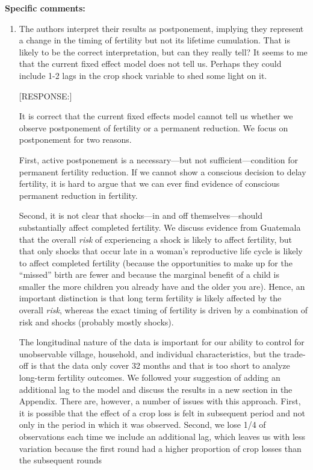\documentclass[letterpaper,12pt]{article}
\begin{document}
\noindent \textbf{Specific comments:}

\begin{enumerate}

\item The authors interpret their results as postponement, implying they
represent a change in the timing of fertility but not its lifetime
cumulation. That is likely to be the correct interpretation, but can
they really tell? It seems to me that the current fixed effect model
does not tell us. Perhaps they could include 1-2 lags in the crop shock
variable to shed some light on it.

[RESPONSE:]

It is correct that the current fixed effects model cannot tell
us whether we observe postponement of fertility or a permanent
reduction.
We focus on postponement for two reasons.

First, active postponement is a necessary---but not sufficient---condition
for permanent fertility reduction.
If we cannot show a conscious decision to delay fertility, it is 
hard to argue that we can ever find evidence of conscious permanent 
reduction in fertility.

Second, it is not clear that shocks---in and off themselves---should
substantially affect completed fertility. 
We discuss evidence from Guatemala that the overall \emph{risk} of 
experiencing a shock is likely to affect fertility, but that only
shocks that occur late in a woman's reproductive life cycle is
likely to affect completed fertility (because the opportunities to
make up for the ``missed'' birth are fewer and because the marginal
benefit of a child is smaller the more children you already have and
the older you are).
Hence, an important distinction is that long term fertility is likely
affected by the overall \emph{risk}, whereas the exact timing of
fertility is driven by a combination of risk and shocks (probably
mostly shocks).

The longitudinal nature of the data is important for our ability
to control for unobservable village, household, and individual 
characteristics, but the trade-off is that the data only cover 
32 months and that is too short to analyze long-term fertility
outcomes.
We followed your suggestion of adding an additional lag to 
the model and discuss the results in a new section in the Appendix.
There are, however, a number of issues with this approach.
First, it is possible that the effect of a crop loss is felt
in subsequent period and not only in the period in which it
was observed.
Second, we lose 1/4 of observations each time we include an 
additional lag, which leaves us with less variation because
the first round had a higher proportion of crop losses than
the subsequent rounds
 

\end{enumerate}
\end{document}
